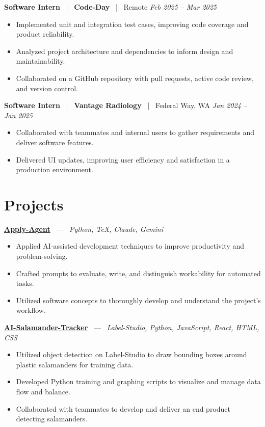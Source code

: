 \documentclass[10pt, letterpaper]{article}
\newcommand{\jobhead}[4]{%
  \vspace{5pt}%
  {\bfseries\color{dark}#1}%
  ~{\color{light}|}~%
  {\bfseries\color{navy}#2}%
  ~{\color{light}|}~%
  {\color{light}#3}%
  \hfill{\color{light}\small\textit{#4}}\\[-2pt]%
}
\newcommand{\projhead}[3]{%
  \vspace{5pt}%
  {\bfseries\color{dark}\href{#2}{#1}}%
  ~{\color{light}---}~%
  {\color{light}\small\textit{#3}}\\[-2pt]%
}
\begin{document}
\jobhead{Software Intern}{Code-Day}{Remote}{Feb 2025 – Mar 2025}
\begin{itemize}
  \item Implemented unit and integration test cases, improving code coverage and product reliability.
  \item Analyzed project architecture and dependencies to inform design and maintainability.
  \item Collaborated on a GitHub repository with pull requests, active code review, and version control.
\end{itemize}

\jobhead{Software Intern}{Vantage Radiology}{Federal Way, WA}{Jan 2024 – Jan 2025}
\begin{itemize}
  \item Collaborated with teammates and internal users to gather requirements and deliver software features.
  \item Delivered UI updates, improving user efficiency and satisfaction in a production environment.
\end{itemize}

\section{Projects}

\projhead{Apply-Agent}{https://github.com/timmyd4/apply-agent}{Python, TeX, Claude, Gemini}
\begin{itemize}
  \item Applied AI-assisted development techniques to improve productivity and problem-solving.
  \item Crafted prompts to evaluate, write, and distinguish workability for automated tasks.
  \item Utilized software concepts to thoroughly develop and understand the project's workflow.
\end{itemize}

\projhead{AI-Salamander-Tracker}{https://github.com/xavierb117/Salamander-Tracker-YOLO}{Label-Studio, Python, JavaScript, React, HTML, CSS}
\begin{itemize}
  \item Utilized object detection on Label-Studio to draw bounding boxes around plastic salamanders for training data.
  \item Developed Python training and graphing scripts to visualize and manage data flow and balance.
  \item Collaborated with teammates to develop and deliver an end product detecting salamanders.
\end{itemize}
\end{document}
